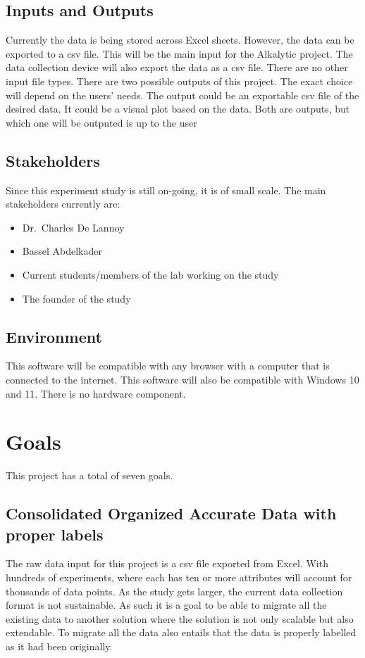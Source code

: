 \documentclass{article}
\begin{document}
\subsection{Inputs and Outputs}
Currently the data is being stored across Excel sheets. However, the data can be
exported to a csv file. This will be the main input for the Alkalytic project.
The data collection device will also export the data as a csv file. There are no
other input file types.
\newline
There are two possible outputs of this project. The exact choice will depend on
the users' needs. The output could be an exportable csv file of the desired
data. It could be a visual plot based on the data. Both are outputs, but which
one will be outputed is up to the user


\subsection{Stakeholders}
Since this experiment study is still on-going, it is of small scale. \newline
The main stakeholders currently are:
\begin{itemize}
    \item Dr.\ Charles De Lannoy
    \item Bassel Abdelkader
    \item Current students/members of the lab working on the study
    \item The founder of the study
\end{itemize}

\subsection{Environment}
This software will be compatible with any browser with a computer that is
connected to the internet. This software will also be compatible with Windows 10
and 11. There is no hardware component.


\section{Goals}
This project has a total of seven goals.
\subsection*{Consolidated Organized Accurate Data with proper labels}
The raw data input for this project is a csv file exported from Excel. With
hundreds of experiments, where each has ten or more attributes will account for
thousands of data points. As the study gets larger, the current data collection
format is not sustainable. As such it is a goal to be able to migrate all the
existing data to another solution where the solution is not only scalable but
also extendable. To migrate all the data also entails that the data is properly
labelled as it had been originally.
\end{document}
